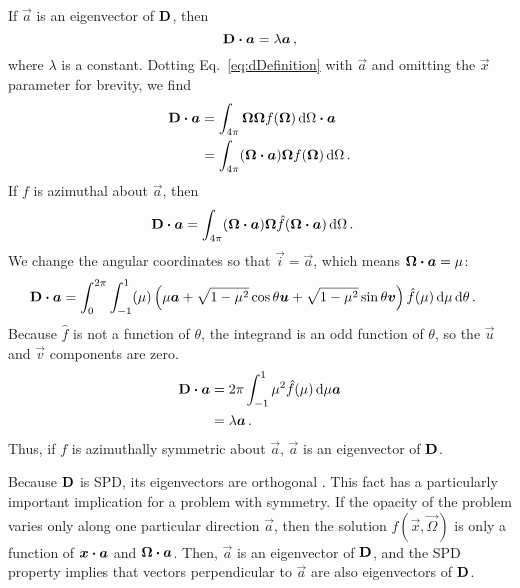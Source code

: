 If $\vec{a}$ is an eigenvector of $\mathbf{D}$, then
\begin{equation*}
  \mathbf{D} \bm{\cdot} \bm{a} = \lambda \bm{a}\,,
\end{equation*}
where $\lambda$ is a constant. Dotting Eq.~\eqref{eq:dDefinition} with
$\vec{a}$ and omitting the $\vec{x}$ parameter for brevity, we find
\begin{align*}
  \mathbf{D} \bm{\cdot} \bm{a}
  &= \int_{4\pi} \bm{\Omega} \bm{\Omega} f(\bm{\Omega}) \mathop{}\!\mathrm{d}\Omega \bm{\cdot} \bm{a}
  \\
  &= \int_{4\pi} (\bm{\Omega} \bm{\cdot} \bm{a}) \bm{\Omega} f(\bm{\Omega}) \mathop{}\!\mathrm{d}\Omega
  \,.
\end{align*}
If $f$ is azimuthal about $\vec{a}$, then
\begin{align*}
  \mathbf{D} \bm{\cdot} \bm{a}
  &= \int_{4\pi} (\bm{\Omega} \bm{\cdot} \bm{a}) \bm{\Omega}
    \hat f(\bm{\Omega} \bm{\cdot} \bm{a}) \mathop{}\!\mathrm{d}\Omega \,.
\end{align*}
We change the angular coordinates so that $\vec{i}=\vec{a}$, which means
$\bm{\Omega} \bm{\cdot} \bm{a}=\mu$:
\begin{align*}
  \mathbf{D} \bm{\cdot} \bm{a}
  &= \int_{0}^{2\pi} \int_{-1}^{1} (\mu)
  \left( \mu \bm{a} + \sqrt{1-\mu^2} \cos \theta \bm{u} + \sqrt{1-\mu^2} \sin
  \theta \bm{v} \right) \hat f(\mu) \mathop{}\!\mathrm{d}\mu \mathop{}\!\mathrm{d}\theta \,.
\end{align*}
Because $\hat f$ is not a function of $\theta$, the integrand is an
odd function of $\theta$, so the $\vec{u}$ and $\vec{v}$ components are zero.
\begin{align*}
  \mathbf{D} \bm{\cdot} \bm{a}
  &= 2\pi \int_{-1}^{1} \mu^2 \hat f(\mu) \mathop{}\!\mathrm{d}\mu \bm{a}
  \\
  &= \lambda \bm{a} \,.
\end{align*}
Thus, if $f$ is azimuthally symmetric about $\vec{a}$, $\vec{a}$ is an
eigenvector of $\mathbf{D}$.

Because $\mathbf{D}$ is SPD, its eigenvectors are orthogonal \cite[p.173]{Tre1997}.
This fact has a particularly important implication for a problem with symmetry.
If the opacity of the problem varies only along one particular direction
$\vec{a}$, then the
solution $f(\vec{x},\vec{\Omega})$ is only a function of $\bm{x}\bm{\cdot} \bm{a}$
and $\bm{\Omega} \bm{\cdot} \bm{a}$. Then, $\vec{a}$ is an eigenvector of $\mathbf{D}$,
and the SPD property implies that vectors perpendicular to $\vec{a}$ are also
eigenvectors of $\mathbf{D}$.

